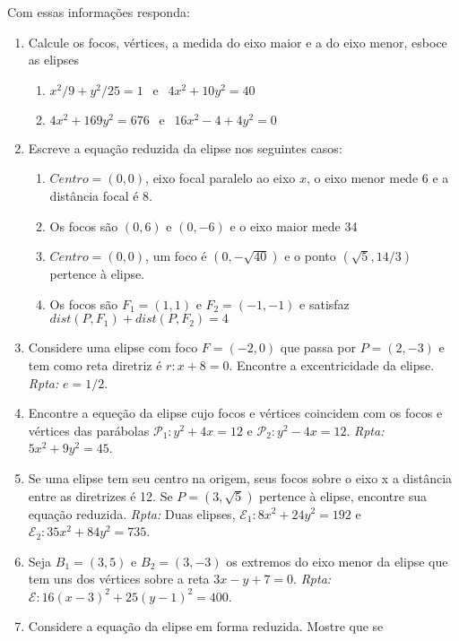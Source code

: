 \documentclass{article}
\begin{document}
  Com essas informações responda:
    \begin{enumerate}
    \item Calcule os focos, vértices, a medida do eixo maior e a do eixo menor, esboce as elipses
       \begin{enumerate}
       \item $x^2/9+y^2/25=1  \ \  \text{ e } \ \ 4x^2+10y^2=40$
       \item $4x^2+169y^2=676  \ \ \text{ e } \ \ 16x^2-4+4y^2=0$ 
       \end{enumerate}
    \item Escreve a equação reduzida da elipse nos seguintes casos:
     \begin{enumerate}
     \item $Centro=(0,0)$, eixo focal paralelo ao eixo $x$, o eixo menor mede 6 e a distância focal é 8. 
     \item Os focos são $(0,6)$ e $(0,-6)$ e o eixo maior mede 34
     \item $Centro=(0,0)$, um foco é $(0,-\sqrt{40})$ e o ponto 
     $(\sqrt{5}, 14/3)$ pertence à elipse.
     \item Os focos são $F_1=(1,1)$ e $F_2=(-1,-1)$
     e satisfaz $dist(P,F_1)+dist(P,F_2)=4$
     \end{enumerate} 
    \item Considere uma elipse com foco $F=(-2,0)$ que passa 
    por $P=(2,-3)$ e tem como reta diretriz é $r:x+8=0$. Encontre a 
    excentricidade da elipse. {\it Rpta: } $e=1/2$.     
    \item  Encontre a equeção da elipse cujo focos e vértices
    coincidem com os focos e vértices das parábolas 
    $\mathcal{P}_1:y^2+4x=12$ e  
    $\mathcal{P}_2:y^2-4x=12$. 
    {\it Rpta: } $5x^2+9y^2=45$. 
    \item Se uma elipse tem seu centro na origem, seus 
    focos sobre o eixo x a distância entre as diretrizes é 12. 
    Se $P=(3,\sqrt{5})$ pertence à elipse, encontre sua equação reduzida. 
    {\it Rpta: } Duas elipses, 
    $\mathcal{E}_1: 8x^2+24y^2=192$ e 
    $\mathcal{E}_2: 35x^2+84y^2=735$. 
    \item Seja $B_1=(3,5)$ e $B_2=(3,-3)$ 
    os extremos do eixo menor da elipse
    que tem uns dos vértices sobre a reta $3x-y+7=0$. 
    {\it Rpta: } $\mathcal{E}: 16(x-3)^2 +25(y-1)^2 =400$.      
    \item Considere a equação da elipse em forma reduzida. Mostre que se 

\end{enumerate}
\end{document}
